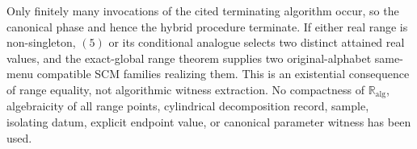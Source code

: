 Only finitely many invocations of the cited terminating algorithm occur, so the canonical phase and hence the hybrid procedure terminate.  If either real range is non-singleton, \((5)\) or its conditional analogue selects two distinct attained real values, and the exact-global range theorem supplies two original-alphabet same-menu compatible SCM families realizing them.  This is an existential consequence of range equality, not algorithmic witness extraction.  No compactness of \(\mathbb R_{\mathrm{alg}}\), algebraicity of all range points, cylindrical decomposition record, sample, isolating datum, explicit endpoint value, or canonical parameter witness has been used.